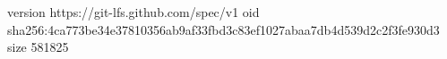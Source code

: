 version https://git-lfs.github.com/spec/v1
oid sha256:4ca773be34e37810356ab9af33fbd3c83ef1027abaa7db4d539d2c2f3fe930d3
size 581825
